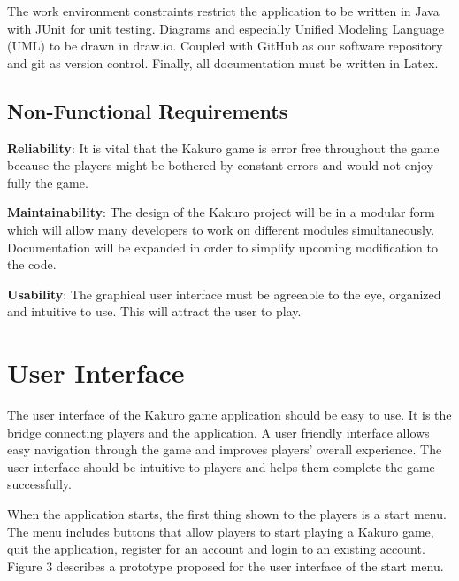 \documentclass[12pt]{article}
\begin{document}
\vspace{5mm}

The work environment constraints restrict the application to be written in Java with JUnit for unit testing. Diagrams and especially Unified Modeling Language (UML) to be drawn in draw.io. Coupled with GitHub as our software repository and git as version control. Finally, all documentation must be written in Latex. 
 

\subsection{Non-Functional Requirements}
 
\textbf{Reliability}: It is vital that the Kakuro game is error free throughout the game because the players might be bothered by constant errors and would not enjoy fully the game.

\vspace{5mm}

\textbf{Maintainability}: The design of the Kakuro project will be in a modular form which will allow many developers to work on different modules simultaneously. Documentation will be expanded in order to simplify upcoming modification to the code. 

\vspace{5mm}

\textbf{Usability}: The graphical user interface must be agreeable to the eye, organized and intuitive to
use. This will attract the user to play. 

\newpage


\section{User Interface}

The user interface of the Kakuro game application should be easy to use. It is the bridge connecting players and the application. A user friendly interface allows easy navigation through the game and improves players' overall experience. The user interface should be intuitive to players and helps them complete the game successfully.

When the application starts, the first thing shown to the players is a start menu. The menu includes buttons that allow players to start playing a Kakuro game, quit the application, register for an account and login to an existing account. Figure 3 describes a prototype proposed for the user interface of the start menu. 
\end{document}
